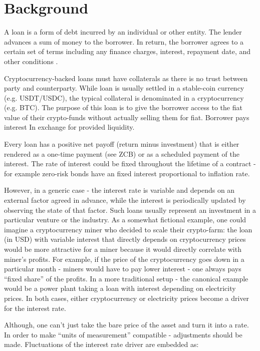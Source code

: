 \documentclass[runningheads]{llncs}
\begin{document}
\section{Background}

A loan is a form of debt incurred by an individual or other entity.
The lender advances a sum of money to the borrower. In return, the
borrower agrees to a certain set of terms including any finance charges,
interest, repayment date, and other conditions \cite{loan}.

Cryptocurrency-backed loans must have collaterals as there is no trust
between party and counterparty. While loan is usually settled in a
stable-coin currency (e.g. USDT/USDC), the typical collateral is denominated
in a cryptocurrency (e.g. BTC). The purpose of this loan is to give
the borrower access to the fiat value of their crypto-funds without
actually selling them for fiat. Borrower pays interest In exchange
for provided liquidity.

Every loan has a positive net payoff (return minus investment) that
is either rendered as a one-time payment (see ZCB) or as a scheduled
payment of the interest. The rate of interest could be fixed throughout
the lifetime of a contract - for example zero-risk bonds have an fixed
interest proportional to inflation rate.

However, in a generic case - the interest rate is variable and depends
on an external factor agreed in advance, while the interest is periodically
updated by observing the state of that factor. Such loans usually
represent an investment in a particular venture or the industry. As
a somewhat fictional example, one could imagine a cryptocurrency miner
who decided to scale their crypto-farm: the loan (in USD) with variable
interest that directly depends on cryptocurrency prices would be more
attractive for a miner because it would directly correlate with miner's
profits. For example, if the price of the cryptocurrency goes down
in a particular month - miners would have to pay lower interest -
one always pays ``fixed share'' of the profits. In a more traditional
setup - the canonical example would be a power plant taking a loan
with interest depending on electricity prices. In both cases, either
cryptocurrency or electricity prices become a driver for the interest
rate.

Although, one can't just take the bare price of the asset and turn
it into a rate. In order to make ``units of measurement'' compatible
- adjustments should be made. Fluctuations of the interest rate driver
are embedded as:
\end{document}
